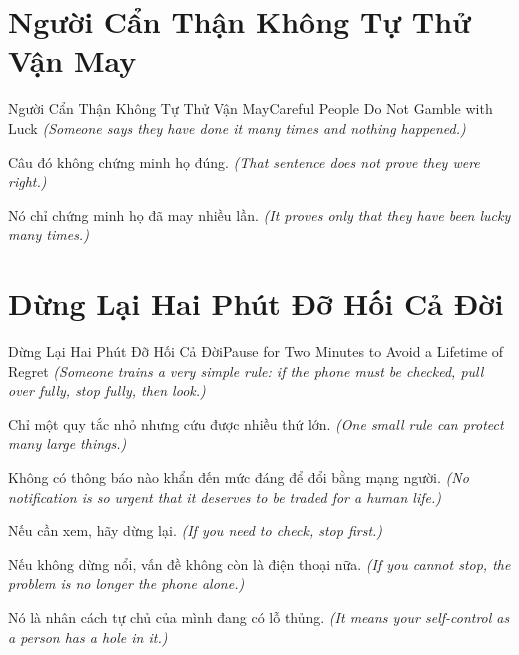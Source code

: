\section{Người Cẩn Thận Không Tự Thử Vận May}
\begin{truyen}{Người Cẩn Thận Không Tự Thử Vận May}{Careful People Do Not Gamble with Luck}
\textit{(Someone says they have done it many times and nothing happened.)}

Câu đó không chứng minh họ đúng.
\textit{(That sentence does not prove they were right.)}

Nó chỉ chứng minh họ đã may nhiều lần.
\textit{(It proves only that they have been lucky many times.)}

\end{truyen}

\section{Dừng Lại Hai Phút Đỡ Hối Cả Đời}
\begin{truyen}{Dừng Lại Hai Phút Đỡ Hối Cả Đời}{Pause for Two Minutes to Avoid a Lifetime of Regret}
\textit{(Someone trains a very simple rule: if the phone must be checked, pull over fully, stop fully, then look.)}

Chỉ một quy tắc nhỏ nhưng cứu được nhiều thứ lớn.
\textit{(One small rule can protect many large things.)}

\end{truyen}

\begin{baihoc}
Không có thông báo nào khẩn đến mức đáng để đổi bằng mạng người.
\textit{(No notification is so urgent that it deserves to be traded for a human life.)}

Nếu cần xem, hãy dừng lại.
\textit{(If you need to check, stop first.)}

Nếu không dừng nổi, vấn đề không còn là điện thoại nữa.
\textit{(If you cannot stop, the problem is no longer the phone alone.)}

Nó là nhân cách tự chủ của mình đang có lỗ thủng.
\textit{(It means your self-control as a person has a hole in it.)}
\end{baihoc}

